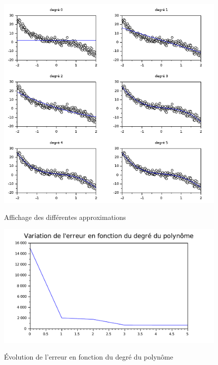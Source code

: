 \documentclass[a4paper,10pt]{report}
\begin{document}
\begin{figure}[H]
\centering
\caption{Affichage des différentes approximations}
\includegraphics[width=\textwidth]{graph_diff_poly.png}
\label{graph_diff_poly}
\end{figure}

\begin{figure}[H]
\centering
\caption{Évolution de l'erreur en fonction du degré du polynôme}
\includegraphics[width=12cm]{erreur_poly.pdf}
\label{erreur_poly}
\end{figure}
\end{document}
